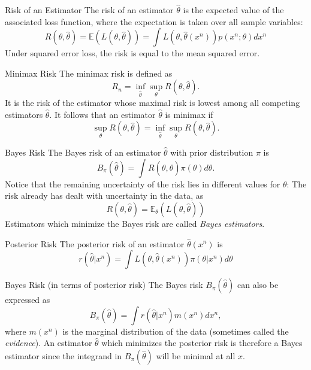 \documentclass[avery5371,grid]{flashcards}
\begin{document}
\begin{flashcard}[Definition]{Risk of an Estimator}
 The risk of an estimator $\hat \theta$ is the expected value of the associated loss function,
 where the expectation is taken over all sample variables:
 \[
 R\left( \theta, \hat \theta \right) = \mathbb E \left( L\left(\theta, \hat \theta \right) \right)
 = \int L\left(\theta, \hat \theta\left(x^n\right) \right) p(x^n;\theta) dx^n
 \]
 Under squared error loss, the risk is equal to the mean squared error.
\end{flashcard}

\begin{flashcard}[Definition]{Minimax Risk}
 The minimax risk is defined as
 \[
 R_n = \inf_{\hat \theta} \sup_\theta R\left( \theta, \hat \theta \right).
 \]
It is the risk of the estimator whose maximal risk is lowest among all competing estimators
$\hat \theta$. It follows that an estimator $\hat \theta$ is minimax if 
\[
\sup_\theta R\left( \theta, \hat \theta \right) = \inf_{\hat \theta} \sup_\theta R\left( \theta, \hat \theta \right).
\]
\end{flashcard}

\begin{flashcard}[Definition]{Bayes Risk}
\scriptsize
The Bayes risk of an estimator $\hat \theta$ with prior distribution $\pi$ is
\[
B_\pi (\hat\theta) = \int R\left( \theta, \hat \theta \right) \pi\left(\theta \right) d\theta. 
\] 
Notice that the remaining uncertainty of the risk lies in different values for $\theta$: The risk already has dealt with 
uncertainty in the data, as 
\[
R\left( \theta, \hat \theta \right) = \mathbb{E}_\theta {\left( L(\theta, \hat \theta)\right)}
\]
Estimators which minimize the Bayes risk are called \textit{Bayes estimators}.
\end{flashcard}

\begin{flashcard}[Definition]{Posterior Risk}
 The posterior risk of an estimator $\hat \theta(x^n)$ is 
 \[
 r(\hat \theta | x^n) = \int L(\theta, \hat \theta(x^n)) \pi(\theta | x^n) d\theta
 \]
\end{flashcard}

\begin{flashcard}[Theorem]{Bayes Risk (in terms of posterior risk)}
 The Bayes risk $B_\pi (\hat \theta)$ can also be expressed as
 \[
 B_\pi(\hat \theta) = \int  r(\hat \theta | x^n) m(x^n) dx^n,
 \]
 where $m(x^n)$ is the marginal distribution of the data (sometimes called the \textit{evidence}). An estimator
 $\hat \theta$ which minimizes the posterior risk is therefore a Bayes estimator 
 since the integrand in  $B_\pi(\hat \theta)$ will be minimal at all $x$.  
\end{flashcard}
\end{document}

